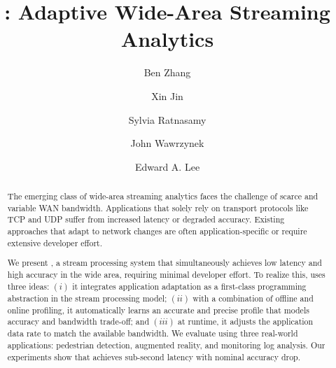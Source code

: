 \documentclass[sigplan, 10pt, timestamp, screen]{acmart}
\begin{document}


\title{\sysname{}: Adaptive Wide-Area Streaming Analytics}

\author{Ben Zhang}

\author{Xin Jin}

\author{Sylvia Ratnasamy}

\author{John Wawrzynek}

\author{Edward A. Lee}

\renewcommand{\shortauthors}{B. Zhang et al.}

\begin{abstract}
  The emerging class of wide-area streaming analytics faces the challenge of
  scarce and variable WAN bandwidth. Applications that solely rely on
  transport protocols like TCP and UDP suffer from increased latency or degraded
  accuracy. Existing approaches that adapt to network changes are often
  application-specific or require extensive developer effort.

  We present \sysname{}, a stream processing system that simultaneously achieves
  low latency and high accuracy in the wide area, requiring minimal developer
  effort. To realize this, \sysname{} uses three ideas: $(i)$ it integrates
  application adaptation as a first-class programming abstraction in the stream
  processing model; $(ii)$ with a combination of offline and online profiling,
  it automatically learns an accurate and precise profile that models accuracy and
  bandwidth trade-off; and $(iii)$ at runtime, it adjusts the application data rate
  to match the available bandwidth. We evaluate \sysname{} using three
  real-world applications: pedestrian detection, augmented reality, and
  monitoring log analysis. Our experiments show that \sysname{} achieves
  sub-second latency with nominal accuracy drop.
\end{abstract}
\end{document}
